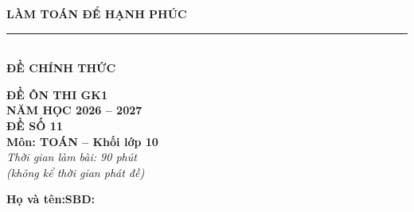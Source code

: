 \documentclass[12pt,a4paper]{article}
\begin{document}
\noindent
\begin{minipage}[c]{0.38\textwidth}
    \centering
    \textbf{LÀM TOÁN ĐỂ HẠNH PHÚC}\\[-2pt]
    \rule{3.2cm}{0.6pt}\\[4pt]
    \textbf{ĐỀ CHÍNH THỨC}
\end{minipage}\hfill
\begin{minipage}[c]{0.35\textwidth}
    \centering
    \textbf{ĐỀ ÔN THI GK1}\\
    \textbf{NĂM HỌC 2026 -- 2027}\\[2pt]
    \textbf{ĐỀ SỐ 11}\\
    \textbf{Môn: TOÁN -- Khối lớp 10}\\
    \textit{\small Thời gian làm bài: 90 phút\\(không kể thời gian phát đề)}
\end{minipage}

\vspace{0.2cm}
\noindent
\begin{minipage}[b]{0.78\textwidth}
    \textbf{Họ và tên:}\dotfill\textbf{SBD:}\makebox[3.5cm]{\dotfill}
\end{minipage}\hfill
\begin{minipage}[b]{0.20\textwidth}
    \hfill
    \setlength{\fboxrule}{0.8pt}%
\end{minipage}
\vspace{0.2cm}
\end{document}
